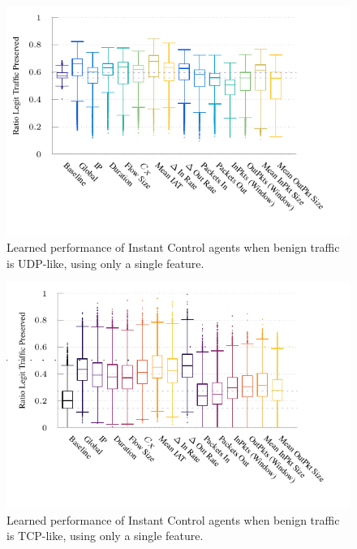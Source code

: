 \documentclass[10pt, times, conference, letterpaper]{IEEEtran}
\begin{document}
\begin{figure}
	\centering
	\includegraphics[width=0.8\linewidth]{../plots/ftprep-cap-box}
	\vspace{-1cm}
	\caption{
		Learned performance of Instant Control agents when benign traffic is UDP-like, using only a single feature.
		\label{fig:udp-feature-plots}
	}
\vspace{-1em}
\end{figure}


\begin{figure}
	\centering
	\includegraphics[width=0.8\linewidth]{../plots/ftprep-tcp-cap-box}
	\vspace{-1cm}
	\caption{
		Learned performance of Instant Control agents when benign traffic is TCP-like, using only a single feature.
		\label{fig:tcp-cap-feature-plots}
	}
	\vspace{-1em}
\end{figure}
\end{document}

